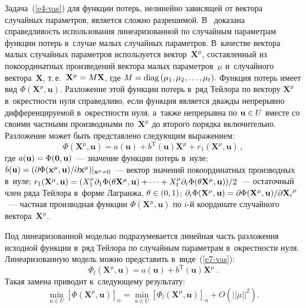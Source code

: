 \begin{multicols}{2}
Задача~(\ref{e4-vas}) для функции потерь, нелинейно зависящей от век\-то\-ра  
случайных па\-ра\-мет\-ров, является слож\-но разрешимой. В~\cite{vaskan2} доказана 
спра\-вед\-ли\-вость\linebreak
 использования линеаризованной по случайным\linebreak
  па\-ра\-мет\-рам 
функции потерь в~случае малых случайных па\-ра\-мет\-ров. 
В~качестве вектора малых случайных па\-ра\-мет\-ров используется вектор~$\mathbf{X}^\mu$,  
со\-став\-лен\-ный из покоординатных произведений вектора малых па\-ра\-мет\-ров~$\mu$ 
и~случайного вектора~$\mathbf{X}$, т.\,е.\ $\mathbf{X}^\mu\hm=M\mathbf{X}$, 
где $M\hm=\mathrm{diag}\,(\mu_1, \mu_2, \ldots , \mu_t).$ 
Функция потерь имеет вид $\Phi(\mathbf {X}^\mu, \mathbf {u}).$ 
Разложение этой функции потерь в~ряд Тейлора по вектору $\mathbf {X}^\mu$
 в~окрест\-ности нуля справедливо, если функция является дваж\-ды непрерывно 
 дифференцируемой в~окрест\-ности нуля, а~так\-же непрерывна по $\mathbf {u}\hm\in U$ 
 вместе со своими част\-ны\-ми производными по~$\mathbf{X}^\mu$ до второго 
 порядка включительно. Разложение может быть пред\-став\-ле\-но следующим выражением:
\begin{equation*}
\Phi\left(\mathbf {X}^\mu, \mathbf {u}\right)= 
a(\mathbf {u})+b^{\mathrm{T}}(\mathbf {u})\mathbf {X}^\mu+r_1
\left(\mathbf {X}^\mu, \mathbf {u}\right)\,,
\end{equation*}
где $a(\mathbf{u})\hm=\Phi(\mathbf {0},\mathbf {u})$~--- 
значение функции потерь в~нуле; $b (\mathbf {u})\hm=({\partial 
\Phi(\mathbf x^\mu,\mathbf u)}/{\partial \mathbf x^\mu})|_{\mathbf x^\mu=0}$~--- 
вектор значений покоординатных производных в~нуле;
  $r_1(\mathbf{X}^\mu, \mathbf {u})\hm= 
  (X_1^\mu \partial _1 \Phi(\theta \mathbf {X}^\mu, \mathbf {u})+\cdots+
  X_t^\mu \partial_t \Phi(\theta \mathbf {X}^\mu, \mathbf {u}))/2$~--- 
  остаточный член ряда Тейлора в~форме Ла\-гран\-жа,
  $\theta \hm\in(0,1)$; $\partial_i \Phi(\mathbf {X}^\mu, \mathbf{u})\hm=
  {\partial \Phi(\mathbf{X}^\mu, \mathbf {u})}/{\partial {\mathbf {X}_i}^\mu}$~--- 
  част\-ная производная функции $\Phi(\mathbf{X}^\mu, \mathbf{u})$ по $i$-й 
  координате случайного век\-то\-ра~$\mathbf {X}^\mu.$


Под линеаризованной моделью подразумевается линейная часть 
разложения исходной функ\-ции в~ряд Тейлора по случайным па\-ра\-мет\-рам в~окрест\-ности нуля. 
Линеаризованную модель мож\-но пред\-ста\-вить в~виде~(\ref{e7-vas}):
\begin{equation*}
\Phi_l\left(\mathbf {X}^\mu, \mathbf {u}\right)=
 a(\mathbf {u})+b^{\mathrm{T}}(\mathbf {u})\mathbf {X}^\mu\,.
\end{equation*}
Такая замена приводит к~следующему результату:
\begin{equation}
\!\!\min_{u\in U} \left[\Phi(\mathbf{X}^\mu, \mathbf {u})\right]_\alpha\!=\!
\min\limits_{u\in U} \left[\Phi_l\left(\mathbf {X}^\mu, \mathbf {u}\right)\right]_\alpha 
+O\left(||\mu||^2\right).\!
\label{e14-vas}
\end{equation}



\end{multicols}
